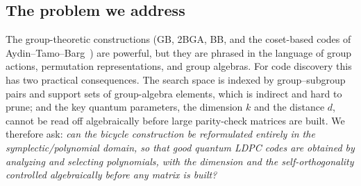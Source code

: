 \documentclass[journal,onecolumn]{IEEEtran}
\theoremstyle{definition}
\theoremstyle{remark}
\begin{document}
\subsection{The problem we address}
The group-theoretic constructions (GB, 2BGA, BB, and the coset-based codes
of Aydin--Tamo--Barg~\cite{ATB}) are powerful, but they are phrased in the
language of group actions, permutation representations, and group algebras.
For code discovery this has two practical consequences. The search space is
indexed by group--subgroup pairs and support sets of group-algebra
elements, which is indirect and hard to prune; and the key quantum
parameters, the dimension $k$ and the distance $d$, cannot be read off
algebraically before large parity-check matrices are built. We therefore
ask: \emph{can the bicycle construction be reformulated entirely in the
symplectic/polynomial domain, so that good quantum LDPC codes are obtained
by analyzing and selecting polynomials, with the dimension and the
self-orthogonality controlled algebraically before any matrix is built?}
\end{document}
